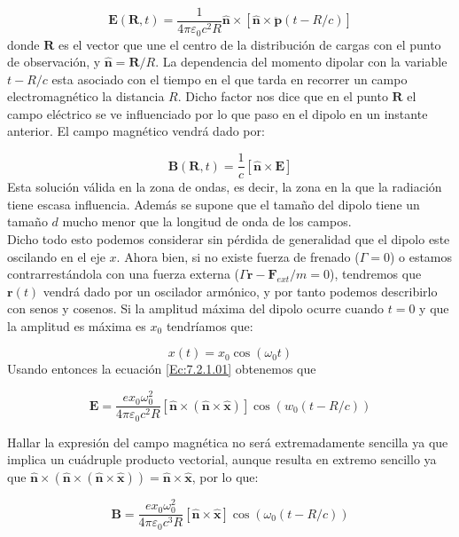 \documentclass[12pt,a4paper]{article}
\newcommand{\Bn}{\mathbf{B}}
\newcommand{\En}{\mathbf{E}}
\newcommand{\Fn}{\mathbf{F}}
\newcommand{\rn}{\mathbf{r}}
\newcommand{\pn}{\mathbf{p}}
\newcommand{\Rn}{\mathbf{R}}
\newcommand{\hnn}{\hat{\mathbf{n}}}
\newcommand{\hnx}{\hat{\mathbf{x}}}
\numberwithin{equation}{section}
\numberwithin{figure}{section}
\begin{document}
\begin{equation}
\En (\Rn,t) = \dfrac{1}{4 \pi  \varepsilon_0 c^2 R} \hnn \times \left[ \hnn \times \ddot{\pn} (t - R/c) \right] \label{Ec:7.2.1.01}
 \end{equation}  
donde $\Rn$ es el vector que une el centro de la distribución de cargas con el punto de observación, y $\hnn  = \Rn / R$. La dependencia del momento dipolar con la variable $t-R/c$ esta asociado con el tiempo en el que tarda en recorrer un campo electromagnético la distancia $R$. Dicho factor nos dice que en el punto $\Rn$ el campo eléctrico se ve influenciado por lo que paso en el dipolo en un instante anterior. El campo magnético vendrá dado por:

\begin{equation}
\Bn (\Rn, t) = \dfrac{1}{c} [\hnn \times \En]
\end{equation}
Esta solución válida en la zona de ondas, es decir, la zona en la que la radiación tiene escasa influencia. Además se supone que el tamaño del dipolo tiene un tamaño $d$ mucho menor que la longitud de onda de los campos. \\

Dicho todo esto podemos considerar sin pérdida de generalidad que el dipolo este oscilando en el eje $x$. Ahora bien, si no existe fuerza de frenado ($\Gamma = 0$) o estamos contrarrestándola con una fuerza externa ($\Gamma \dot{\rn}-\Fn_{ext}/m = 0$), tendremos que $\rn(t)$ vendrá dado por un oscilador armónico, y por tanto podemos describirlo con senos y cosenos. Si la amplitud máxima del dipolo ocurre cuando $t=0$ y que la amplitud es máxima es $x_0$ tendríamos que:

\begin{equation}
x(t) = x_0 \cos (\omega_0 t) 
\end{equation}
Usando entonces la ecuación \ref{Ec:7.2.1.01} obtenemos que

\begin{equation}
\En = \dfrac{e x_0 \omega_0^2 }{4 \pi \varepsilon_0 c^2 R } [\hnn \times (\hnn \times \hnx)] \cos (w_0 (t-R/c))
\end{equation}

Hallar la expresión del campo magnética no será extremadamente sencilla ya que implica un cuádruple producto vectorial, aunque resulta en extremo sencillo ya que $\hnn \times (\hnn \times (\hnn \times \hnx)) = \hnn \times \hnx$, por lo que:

\begin{equation}
\Bn = \dfrac{e x_0 \omega_0^2}{4 \pi \varepsilon_0 c^3 R} [\hnn \times \hnx] \cos (\omega_0 (t-R/c)) 
\end{equation}
\end{document}
